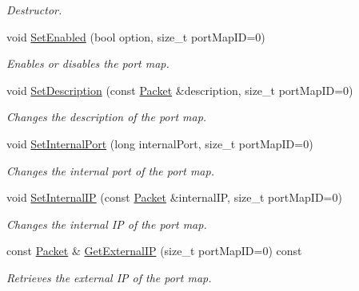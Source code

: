 \begin{DoxyCompactItemize}
\begin{DoxyCompactList}\small\item\em Destructor. \item\end{DoxyCompactList}\item 
void \hyperlink{class_upnp_nat_port_map_action_ab612f6e5dbdb1e7ffbc047961d4727bf}{SetEnabled} (bool option, size\_\-t portMapID=0)
\begin{DoxyCompactList}\small\item\em Enables or disables the port map. \item\end{DoxyCompactList}\item 
void \hyperlink{class_upnp_nat_port_map_action_a381db69d4a6ef9d423ffd523acde76a2}{SetDescription} (const \hyperlink{class_packet}{Packet} \&description, size\_\-t portMapID=0)
\begin{DoxyCompactList}\small\item\em Changes the description of the port map. \item\end{DoxyCompactList}\item 
void \hyperlink{class_upnp_nat_port_map_action_a67abe5dab38fd064feb0dbf27d1e7501}{SetInternalPort} (long internalPort, size\_\-t portMapID=0)
\begin{DoxyCompactList}\small\item\em Changes the internal port of the port map. \item\end{DoxyCompactList}\item 
void \hyperlink{class_upnp_nat_port_map_action_a86af7ee8f970adcce16e9a1687a0fb83}{SetInternalIP} (const \hyperlink{class_packet}{Packet} \&internalIP, size\_\-t portMapID=0)
\begin{DoxyCompactList}\small\item\em Changes the internal IP of the port map. \item\end{DoxyCompactList}\item 
const \hyperlink{class_packet}{Packet} \& \hyperlink{class_upnp_nat_port_map_action_a8b0563a726e99b4e3c9abdae3686ba8d}{GetExternalIP} (size\_\-t portMapID=0) const 
\begin{DoxyCompactList}\small\item\em Retrieves the external IP of the port map. \item\end{DoxyCompactList}\item 

\end{DoxyCompactItemize}
